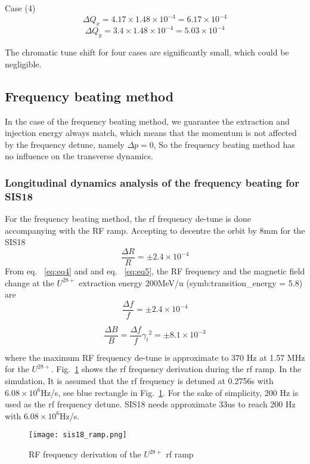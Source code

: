 Case (4) 
\begin{equation}
\Delta Q_x = 4.17 \times 1.48 \times 10^{-4}=6.17 \times 10^{-4}
\end{equation}
\begin{equation}
\Delta Q_y = 3.4 \times 1.48 \times 10^{-4}=5.03 \times 10^{-4} 
\end{equation}

The chromatic tune shift for four cases are significantly small, which could be negligible.
\subsection{Frequency beating method}
In the case of the frequency beating method, we guarantee the extraction and injection energy always match, which means that the momentum is not affected by the frequency detune, namely $\Delta p = 0$, So the frequency beating method has no influence on the transverse dynamics.

\subsubsection{Longitudinal dynamics analysis of the frequency beating for SIS18}
For the frequency beating method, the rf frequency de-tune is done accompanying with
the RF ramp. Accepting to decentre the orbit by 8mm for the SIS18 
\begin{equation}
\frac{\Delta{R}}{R} = \pm 2.4 \times 10^{-4}
\end{equation}
From eq. ~\ref{eq:eq4} and and eq. ~\ref{eq:eq5}, the RF frequency and the magnetic field change at the $U^{28+}$ extraction energy 200MeV/u (\gls{symb:transition_energy} = 5.8) are
\begin{equation}
\frac{\Delta{f}}{f} = \pm 2.4 \times 10^{-4}
\end{equation}

\begin{equation}
\frac{\Delta{B}}{B}=\frac{\Delta{f}}{f}{\gamma_t}^2 = \pm 8.1 \times 10^{-3}
\end{equation}

where the maximum RF frequency de-tune is approximate to 370 Hz at 1.57 MHz for the $U^{ 28+}$. Fig.~\ref{sis18_ramp} shows the rf frequency derivation during the rf ramp. In the simulation, It is assumed that the rf frequency is detuned at 0.2756s with $6.08 \times 10^{6}$Hz/s, see blue rectangle in Fig.~\ref{sis18_ramp}. For the sake of simplicity, 200 Hz is used as the rf frequency detune. SIS18 needs approximate 33us to reach 200 Hz with $6.08 \times 10^{6}$Hz/s.
\begin{figure}[!htb]
   \centering   
   \texttt{[image: sis18\_ramp.png]}
   \caption{RF frequency derivation of the $U^{28+}$ rf ramp}
   \label{sis18_ramp}
\end{figure}

